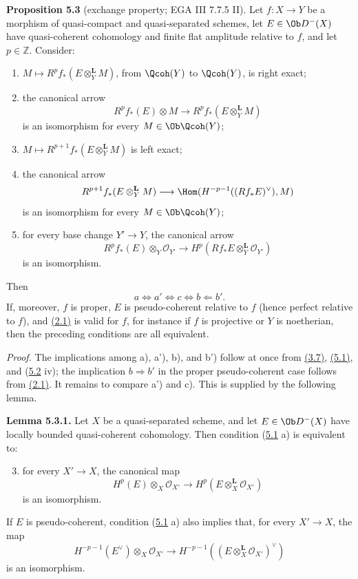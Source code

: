 \textbf{Proposition 5.3} (exchange property; EGA III 7.7.5 II). Let \(f:X\to Y\) be a morphism of quasi-compact and quasi-separated schemes, let \(E\in\Ob D^{-}(X)\) have quasi-coherent cohomology and finite flat amplitude relative to \(f\), and let \(p\in\mathbb Z\). Consider:
\begin{enumerate}[label=\alph*)]
\item \(M\mapsto R^pf_*(E\otimes_Y^{\mathbf L}M)\), from \(\Qcoh(Y)\) to \(\Qcoh(Y)\), is right exact;
\item[\(\mathrm a'\)] the canonical arrow
\[
 R^pf_*(E)\otimes M
 \longrightarrow
 R^pf_*(E\otimes_Y^{\mathbf L}M)
\]
is an isomorphism for every \(M\in\Ob\Qcoh(Y)\);
\item[\(\mathrm b\)] \(M\mapsto R^{p+1}f_*(E\otimes_Y^{\mathbf L}M)\) is left exact;
\item[\(\mathrm b'\)] the canonical arrow
\[
 R^{p+1}f_*(E\otimes_Y^{\mathbf L}M)
 \longrightarrow
 \Hom(H^{-p-1}((Rf_*E)^{\vee}),M)
\]
is an isomorphism for every \(M\in\Ob\Qcoh(Y)\);
\item[\(\mathrm c\)] for every base change \(Y'\to Y\), the canonical arrow
\[
 R^pf_*(E)\otimes_Y\mathcal O_{Y'}
 \longrightarrow
 H^p(Rf_*E\otimes_Y^{\mathbf L}\mathcal O_{Y'})
\]
is an isomorphism.
\end{enumerate}
Then
\[
 a\Longleftrightarrow a'\Longleftrightarrow c\Longleftrightarrow b\Longleftarrow b'.
\]
If, moreover, \(f\) is proper, \(E\) is pseudo-coherent relative to \(f\) (hence perfect relative to \(f\)), and \hyperlink{sga6.e03.conj.2-1}{(2.1)} is valid for \(f\), for instance if \(f\) is projective or \(Y\) is noetherian, then the preceding conditions are all equivalent.

\emph{Proof.} The implications among a), a'), b), and b') follow at once from \hyperlink{sga6.e03.prop.3-7}{(3.7)}, \hyperlink{sga6.e03.lem.5-1}{(5.1)}, and (\hyperlink{sga6.e03.rem.5-2}{5.2} iv); the implication \(b\Rightarrow b'\) in the proper pseudo-coherent case follows from \hyperlink{sga6.e03.conj.2-1}{(2.1)}. It remains to compare a') and c). This is supplied by the following lemma.

\textbf{Lemma 5.3.1.} Let \(X\) be a quasi-separated scheme, and let \(E\in\Ob D^{-}(X)\) have locally bounded quasi-coherent cohomology. Then condition (\hyperlink{sga6.e03.lem.5-1}{5.1} a) is equivalent to:
\begin{enumerate}[label=\alph*)]
\setcounter{enumi}{2}
\item for every \(X'\to X\), the canonical map
\[
 H^p(E)\otimes_X\mathcal O_{X'}
 \longrightarrow
 H^p(E\otimes_X^{\mathbf L}\mathcal O_{X'})
\]
is an isomorphism.
\end{enumerate}
If \(E\) is pseudo-coherent, condition (\hyperlink{sga6.e03.lem.5-1}{5.1} a) also implies that, for every \(X'\to X\), the map
\[
 H^{-p-1}(E^{\vee})\otimes_X\mathcal O_{X'}
 \longrightarrow
 H^{-p-1}((E\otimes_X^{\mathbf L}\mathcal O_{X'})^{\vee})
\tag{5.3.1.1}
\]
is an isomorphism.

